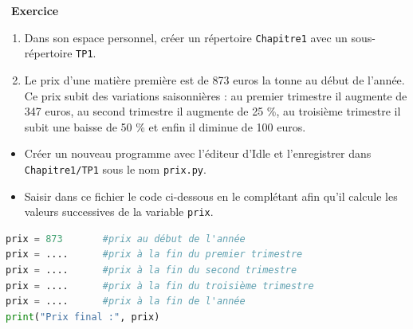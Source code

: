 \documentclass[
  11pt,
]{article}
\newcommand{\passthrough}[1]{#1}
\providecommand{\tightlist}{%
  \setlength{\itemsep}{0pt}\setlength{\parskip}{0pt}}
\newcounter{exo}
\newenvironment{exercice}[1]
{\par \medskip   \addtocounter{exo}{1} \noindent  
\begin{bclogo}[arrondi =0.1,   noborder = true, logo=\bccrayon, marge=4]{~\textbf{Exercice} \textbf{\theexo} {\itshape #1} }  \par}
{
\end{bclogo}
 \par \bigskip }
\newcounter{def}
\newcounter{prog}
\begin{document}
\begin{exercice}{}

\begin{enumerate}
\def\labelenumi{\arabic{enumi}.}
\tightlist
\item
  Dans son espace personnel, créer un répertoire
  \passthrough{\lstinline!Chapitre1!} avec un sous-répertoire
  \passthrough{\lstinline!TP1!}.
\item
  Le prix d'une matière première est de 873 euros la tonne au début de
  l'année. Ce prix subit des variations saisonnières : au premier
  trimestre il augmente de 347 euros, au second trimestre il augmente de
  25 \%, au troisième trimestre il subit une baisse de 50 \% et enfin il
  diminue de 100 euros.
\end{enumerate}

\begin{itemize}
\item
  Créer un nouveau programme avec l'éditeur d'Idle et l'enregistrer dans
  \passthrough{\lstinline!Chapitre1/TP1!} sous le nom
  \passthrough{\lstinline!prix.py!}.
\item
  Saisir dans ce fichier le code ci-dessous en le complétant afin qu'il
  calcule les valeurs successives de la variable
  \passthrough{\lstinline!prix!}.
\end{itemize}

\begin{lstlisting}[language=Python]
prix = 873       #prix au début de l'année
prix = ....      #prix à la fin du premier trimestre
prix = ....      #prix à la fin du second trimestre
prix = ....      #prix à la fin du troisième trimestre
prix = ....      #prix à la fin de l'année
print("Prix final :", prix)
\end{lstlisting}

\end{exercice}
\end{document}
